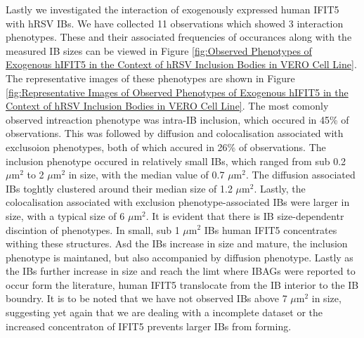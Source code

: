 Lastly we investigated the interaction of exogenously expressed human IFIT5 with hRSV IBs. We have collected 11 observations which showed 3 interaction phenotypes. These and their associated frequencies of occurances along with the measured IB sizes can be viewed in Figure \ref{fig:Observed Phenotypes of Exogenous hIFIT5 in the Context of hRSV Inclusion Bodies in VERO Cell Line}. The representative images of these phenotypes are shown in Figure \ref{fig:Representative Images of Observed Phenotypes of Exogenous hIFIT5 in the Context of hRSV Inclusion Bodies in VERO Cell Line}. The most comonly observed intreaction phenotype was intra-IB inclusion, which occured in 45\% of observations. This was followed by diffusion and colocalisation associated with exclusoion phenotypes, both of which accured in 26\% of observations. The inclusion phenotype occured in relatively small IBs, which ranged from sub 0.2 \(\mu \mbox{m}^2\) to 2 \(\mu \mbox{m}^2\) in size, with the median value of 0.7 \(\mu \mbox{m}^2\). The diffusion associated IBs toghtly clustered around their median size of 1.2 \(\mu \mbox{m}^2\). Lastly, the colocalisation associated with exclusion phenotype-associated IBs were larger in size, with a typical size of 6 \(\mu \mbox{m}^2\). It is evident that there is IB size-dependentr discintion of phenotypes. In small, sub 1 \(\mu \mbox{m}^2\) IBs human IFIT5 concentrates withing these structures. Asd the IBs increase in size and mature, the inclusion phenotype is maintaned, but also accompanied by diffusion phenotype. Lastly as the IBs further increase in size and reach the limt where IBAGs were reported to occur form the literature, human IFIT5 translocate from the IB interior to the IB boundry. It is to be noted that we have not observed IBs above 7 \(\mu \mbox{m}^2\) in size, suggesting yet again that we are dealing with a incomplete dataset or the increased concentraton of IFIT5 prevents larger IBs from forming.

